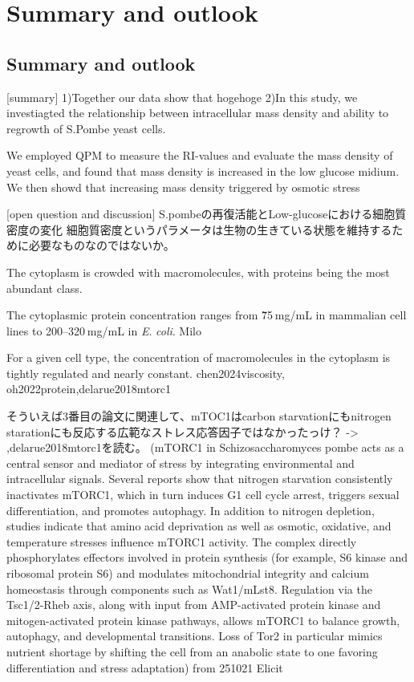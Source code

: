 \chapter{Summary and outlook}
\section{Summary and outlook}
[summary]
1)Together our data show that hogehoge
2)In this study, we investiagted the relationship between intracellular mass density and ability to regrowth of S.Pombe yeast cells.

We employed QPM to measure the RI-values and evaluate the mass density of yeast cells, and found that mass density is increased in the low glucose midium. We then showd that increasing mass density triggered by osmotic stress 

[open question and discussion]
S.pombeの再復活能とLow-glucoseにおける細胞質密度の変化
細胞質密度というパラメータは生物の生きている状態を維持するために必要なものなのではないか。

The cytoplasm is crowded with macromolecules, with proteins being the most abundant class. 

The cytoplasmic protein concentration ranges from \~75 mg/mL in mammalian cell lines to 200–320 mg/mL in \textit{E}. \textit{coli}. Milo

For a given cell type, the concentration of macromolecules in the cytoplasm is tightly regulated and nearly constant. chen2024viscosity, oh2022protein,delarue2018mtorc1

そういえば3番目の論文に関連して、mTOC1はcarbon starvationにもnitrogen starationにも反応する広範なストレス応答因子ではなかったっけ？ -> ,delarue2018mtorc1を読む。
(mTORC1 in Schizosaccharomyces pombe acts as a central sensor and mediator of stress by integrating environmental and intracellular signals. Several reports show that nitrogen starvation consistently inactivates mTORC1, which in turn induces G1 cell cycle arrest, triggers sexual differentiation, and promotes autophagy. In addition to nitrogen depletion, studies indicate that amino acid deprivation as well as osmotic, oxidative, and temperature stresses influence mTORC1 activity.
The complex directly phosphorylates effectors involved in protein synthesis (for example, S6 kinase and ribosomal protein S6) and modulates mitochondrial integrity and calcium homeostasis through components such as Wat1/mLst8. Regulation via the Tsc1/2-Rheb axis, along with input from AMP-activated protein kinase and mitogen-activated protein kinase pathways, allows mTORC1 to balance growth, autophagy, and developmental transitions. Loss of Tor2 in particular mimics nutrient shortage by shifting the cell from an anabolic state to one favoring differentiation and stress adaptation) from 251021 Elicit

